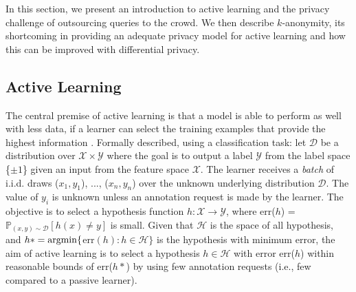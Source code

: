 \documentclass[letterpaper]{article}
\newcommand{\argmin}{\operatornamewithlimits{argmin}}
\begin{document}
In this section, we present an introduction to active learning and the privacy challenge of outsourcing queries to the crowd. We then describe $k$-anonymity, its shortcoming in providing an adequate privacy model for active learning and how this can be improved with differential privacy.

\subsection{Active Learning}

The central premise of active learning is that a model is able to perform as well with less data, if a learner can select the training examples that provide the highest information \cite{settles1648active}. Formally described, using a classification task: let $\mathcal{D}$ be a distribution over $\mathcal{X} \times \mathcal{Y}$ where the goal is to output a label $\mathcal{Y}$ from the label space \{$\pm1$\} given an input from the feature space $\mathcal{X}$. The learner receives a \textit{batch} of i.i.d. draws ($x_1,y_1$), ..., ($x_n,y_n$) over the unknown underlying distribution $\mathcal{D}$. The value of $y_i$ is unknown unless an annotation request is made by the learner. The objective is to select a hypothesis function $h: \mathcal{X} \to \mathcal{Y}$, where err($h$) = $\mathbb{P}_{(x,y)\sim\mathcal{D}}[h(x) \neq y]$ is small. Given that $\mathcal{H}$ is the space of all hypothesis, and $h* = \argmin\{$err$(h) : h \in \mathcal{H}\}$ is the hypothesis with minimum error, the aim of active learning is to select a hypothesis $h \in \mathcal{H}$ with error err($h$) within reasonable bounds of err($h*$) by using few annotation requests (i.e., few compared to a passive learner).
\end{document}
